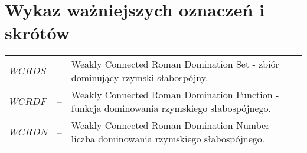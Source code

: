 \chapter*{Wykaz ważniejszych oznaczeń i skrótów}

\begin{tabular}{@{} l l p{} @{}}
    $WCRDS$ & -- & Weakly Connected Roman Domination Set - zbiór dominujący rzymski słabospójny.\\
    $WCRDF$ & -- & Weakly Connected Roman Domination Function - funkcja dominowania rzymskiego słabospójnego. \\
    $WCRDN$ & -- & Weakly Connected Roman Domination Number - liczba dominowania rzymskiego słabospójnego.\\
\end{tabular}
